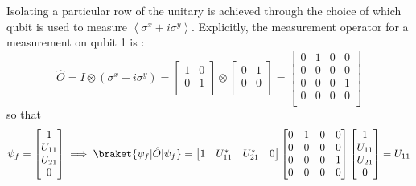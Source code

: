 Isolating a particular row of the unitary is achieved through the choice of which qubit is used to measure $\left< \sigma^{x} + i\sigma^{y} \right>$.
Explicitly, the measurement operator for a measurement on qubit 1 is :
\begin{equation}
    \hat{O}=I \otimes (\sigma^{x} + i\sigma^{y}) =
    \begin{bmatrix}
        1 & 0\\
        0 & 1\\
    \end{bmatrix}
    \otimes
    \begin{bmatrix}
        0 & 1\\
        0 & 0\\
    \end{bmatrix}=
    \begin{bmatrix}
        0 & 1 & 0 & 0\\
        0 & 0 & 0 & 0\\
        0 & 0 & 0 & 1\\
        0 & 0 & 0 & 0\\
    \end{bmatrix}
\end{equation}
so that
\begin{equation}
    \psi_{f}=
    \begin{bmatrix}
        1 \\
        U_{11} \\
        U_{21} \\
        0 \\
    \end{bmatrix}
    \implies
    \braket{\psi_{f}|\hat{O}|\psi_{f}} =
    \begin{bmatrix}
        1 & U_{11}^{*} & U_{21}^{*} & 0
    \end{bmatrix}
    \begin{bmatrix}
        0 & 1 & 0 & 0\\
        0 & 0 & 0 & 0\\
        0 & 0 & 0 & 1\\
        0 & 0 & 0 & 0\\
    \end{bmatrix}
    \begin{bmatrix}
        1 \\
        U_{11} \\
        U_{21} \\
        0 \\
    \end{bmatrix}
    = U_{11}
\end{equation}
